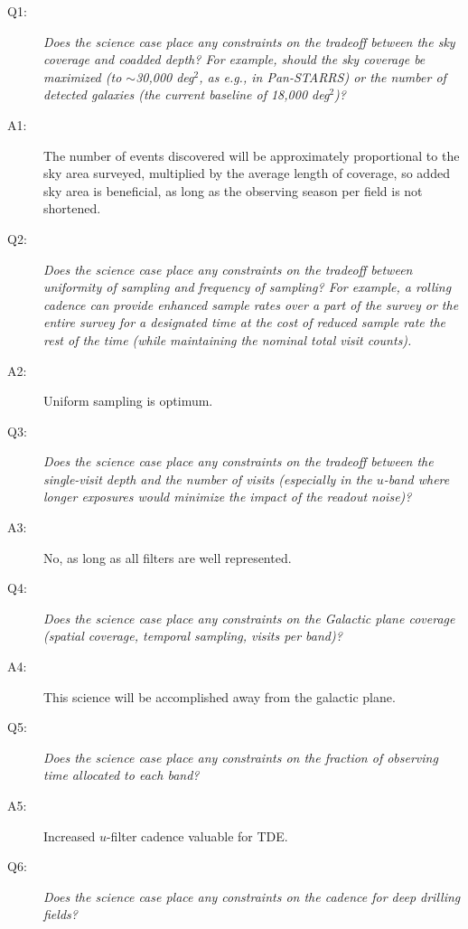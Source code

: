  \begin{description}

 \item[Q1:] {\it Does the science case place any constraints on the
 tradeoff between the sky coverage and coadded depth? For example, should
 the sky coverage be maximized (to $\sim$30,000 deg$^2$, as e.g., in
 Pan-STARRS) or the number of detected galaxies (the current baseline
 of 18,000 deg$^2$)?}

 \item[A1:] The number of events discovered will be approximately proportional to the sky area surveyed, multiplied by the
 average length of coverage, so added sky area is beneficial, as long as the observing season per field is not shortened.

 \item[Q2:] {\it Does the science case place any constraints on the
 tradeoff between uniformity of sampling and frequency of  sampling? For
 example, a rolling cadence can provide enhanced sample rates over a part
 of the survey or the entire survey for a designated time at the cost of
 reduced sample rate the rest of the time (while maintaining the nominal
 total visit counts).}

 \item[A2:] Uniform sampling is optimum.

 \item[Q3:] {\it Does the science case place any constraints on the
 tradeoff between the single-visit depth and the number of visits
 (especially in the $u$-band where longer exposures would minimize the
 impact of the readout noise)?}

 \item[A3:] No, as long as all filters are well represented.

 \item[Q4:] {\it Does the science case place any constraints on the
 Galactic plane coverage (spatial coverage, temporal sampling, visits per
 band)?}

 \item[A4:] This science will be accomplished away from the galactic plane.

 \item[Q5:] {\it Does the science case place any constraints on the
 fraction of observing time allocated to each band?}

 \item[A5:] Increased $u$-filter cadence valuable for TDE.

 \item[Q6:] {\it Does the science case place any constraints on the
 cadence for deep drilling fields?}


\end{description}
